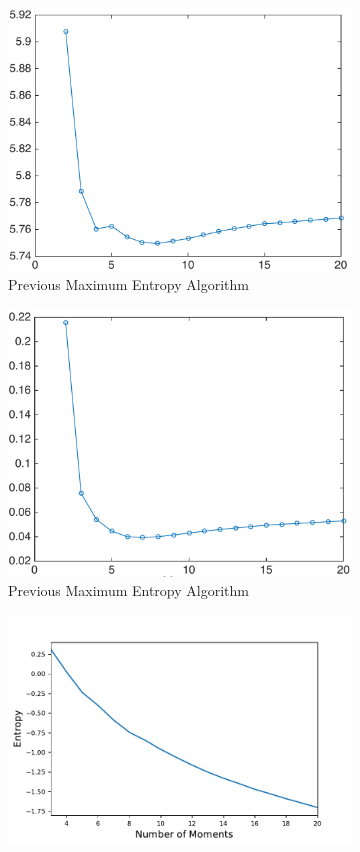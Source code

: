 \documentclass[letterpaper]{article} %
\begin{document}
\begin{figure}
	\begin{subfigure}%
		\centering
		\includegraphics[width=.8\linewidth]{momentsentropy_smpl_30_dataset_thermomech_TCcrop}
		\caption{Previous Maximum Entropy Algorithm}
		\label{fig:previousmaxentmomentsentropy}
	\end{subfigure}
	\begin{subfigure}%
		\centering
		\includegraphics[width=.8\linewidth]{momentserror_smpl_30_dataset_thermomech_TCcrop}
		\caption{Previous Maximum Entropy Algorithm}
		\label{fig:previousmaxentmomentserror}
	\end{subfigure}
	\begin{subfigure}%
		\centering
		\includegraphics[width=.8\linewidth]{entropyvsmomentsthermonew}

\end{subfigure}
\end{figure}
\end{document}
